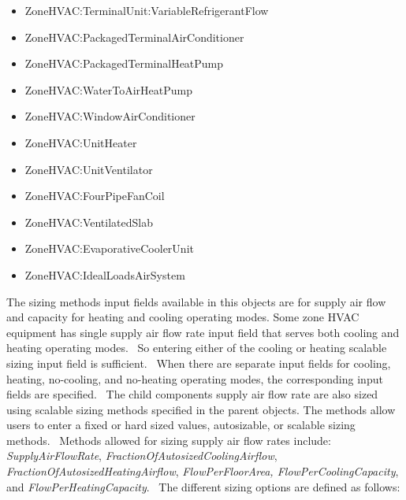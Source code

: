 \begin{itemize}
\item
  ZoneHVAC:TerminalUnit:VariableRefrigerantFlow
\item
  ZoneHVAC:PackagedTerminalAirConditioner
\item
  ZoneHVAC:PackagedTerminalHeatPump
\item
  ZoneHVAC:WaterToAirHeatPump
\item
  ZoneHVAC:WindowAirConditioner
\item
  ZoneHVAC:UnitHeater
\item
  ZoneHVAC:UnitVentilator
\item
  ZoneHVAC:FourPipeFanCoil
\item
  ZoneHVAC:VentilatedSlab
\item
  ZoneHVAC:EvaporativeCoolerUnit
\item
  ZoneHVAC:IdealLoadsAirSystem
\end{itemize}

The sizing methods input fields available in this objects are for supply air flow and capacity for heating and cooling operating modes. Some zone HVAC equipment has single supply air flow rate input field that serves both cooling and heating operating modes.~ So entering either of the cooling or heating scalable sizing input field is sufficient.~ When there are separate input fields for cooling, heating, no-cooling, and no-heating operating modes, the corresponding input fields are specified.~ The child components supply air flow rate are also sized using scalable sizing methods specified in the parent objects. The methods allow users to enter a fixed or hard sized values, autosizable, or scalable sizing methods.~ Methods allowed for sizing supply air flow rates include: \emph{SupplyAirFlowRate}, \emph{FractionOfAutosizedCoolingAirflow}, \emph{FractionOfAutosizedHeatingAirflow}, \emph{FlowPerFloorArea, FlowPerCoolingCapacity}, and \emph{FlowPerHeatingCapacity}.~ The different sizing options are defined as follows:

